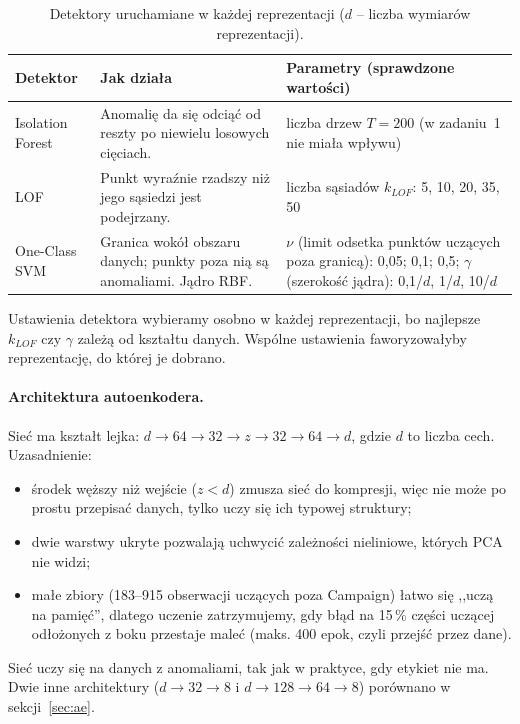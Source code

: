 \documentclass[11pt,a4paper]{article}
\begin{document}
\begin{table}[H]
  \centering\small
  \caption{Detektory uruchamiane w każdej reprezentacji ($d$ -- liczba
  wymiarów reprezentacji).}
  \label{tab:detectors}
  \begin{tabular}{L{2.4cm}L{7.6cm}L{4.9cm}}
    \toprule
    Detektor & Jak działa & Parametry (sprawdzone wartości) \\
    \midrule
    Isolation Forest & Anomalię da się odciąć od reszty po niewielu losowych
    cięciach. & liczba drzew $T=200$ (w zadaniu~1 nie miała wpływu) \\
    \addlinespace
    LOF & Punkt wyraźnie rzadszy niż jego sąsiedzi jest podejrzany. &
    liczba sąsiadów $k_{LOF}$: 5, 10, 20, 35, 50 \\
    \addlinespace
    One-Class SVM & Granica wokół obszaru danych; punkty poza nią są
    anomaliami. Jądro RBF. & $\nu$ (limit odsetka punktów uczących poza
    granicą): 0,05; 0,1; 0,5; $\gamma$ (szerokość jądra): 0,1/$d$, 1/$d$,
    10/$d$ \\
    \bottomrule
  \end{tabular}
\end{table}

Ustawienia detektora wybieramy osobno w każdej reprezentacji, bo najlepsze
$k_{LOF}$ czy $\gamma$ zależą od kształtu danych. Wspólne ustawienia
faworyzowałyby reprezentację, do której je dobrano.

\paragraph{Architektura autoenkodera.} Sieć ma kształt lejka: $d \to 64
\to 32 \to z \to 32 \to 64 \to d$, gdzie $d$ to liczba cech. Uzasadnienie:
\begin{itemize}
  \item środek węższy niż wejście ($z<d$) zmusza sieć do kompresji, więc nie
  może po prostu przepisać danych, tylko uczy się ich typowej struktury;
  \item dwie warstwy ukryte pozwalają uchwycić zależności nieliniowe, których
  PCA nie widzi;
  \item małe zbiory (183--915 obserwacji uczących poza Campaign) łatwo się
  ,,uczą na pamięć'', dlatego uczenie zatrzymujemy, gdy błąd na 15\,\% części
  uczącej odłożonych z boku przestaje maleć (maks. 400 epok, czyli przejść
  przez dane).
\end{itemize}
Sieć uczy się na danych z anomaliami, tak jak w praktyce, gdy etykiet nie ma.
Dwie inne architektury ($d\to32\to8$ i $d\to128\to64\to8$) porównano
w sekcji~\ref{sec:ae}.
\end{document}
